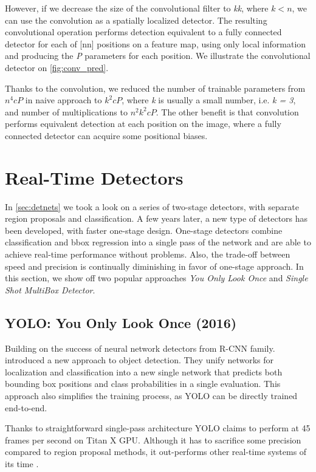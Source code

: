 However, if we decrease the size of the convolutional filter to \textit{k\x k}, where $k < n$, we can use the convolution as a spatially localized detector. The resulting convolutional operation performs detection equivalent to a fully connected detector for each of [n\x n] positions on a feature map, using only local information and producing the \textit{P} parameters for each position. We illustrate the convolutional detector on \cref{fig:conv_pred}.

Thanks to the convolution, we reduced the number of trainable parameters from $n^4cP$ in naive approach to $k^2cP$, where \textit{k} is usually a small number, i.e. \textit{k = 3}, and number of multiplications to $n^2k^2cP$. The other benefit is that convolution performs equivalent detection at each position on the image, where a fully connected detector can acquire some positional biases.



\section{Real-Time Detectors}
\label{sec:rltm}
In \cref{sec:detnets} we took a look on a series of two-stage detectors, with separate region proposals and classification. A few years later, a new type of detectors has been developed, with faster one-stage design. One-stage detectors combine classification and bbox regression into a single pass of the network and are able to achieve real-time performance without problems. Also, the trade-off between speed and precision is continually diminishing in favor of one-stage approach. In this section, we show off two popular approaches \textit{You Only Look Once} and \textit{Single Shot MultiBox Detector}.

\subsection{YOLO: You Only Look Once (2016)}
\label{sec:yolo}
Building on the success of neural network detectors from R-CNN family. \citeauthor{bib:yolo} \cite{bib:yolo} introduced a new approach to object detection. They unify networks for localization and classification into a new single network that predicts both bounding box positions and class probabilities in a single evaluation. This approach also simplifies the training process, as YOLO can be directly trained end-to-end. 

Thanks to straightforward single-pass architecture YOLO claims to perform at 45 frames per second on Titan X GPU. Although it has to sacrifice some precision compared to region proposal methods, it out-performs other real-time systems of its time \cite{bib:overfeat}.


